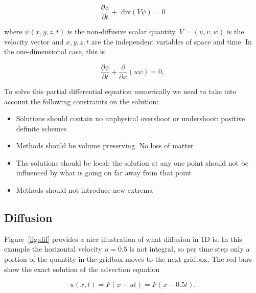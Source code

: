 \documentclass[10pt, a4paper]{article}
\begin{document}
\begin{equation}
\frac{\partial \psi}{\partial t} + \text{ div}(V\psi) = 0
\end{equation}

where $\psi(x,y,z,t)$ is the non-diffusive scalar quantity, $V=(u,v,w)$ is the velocity vector and $x,y,z,t$ are the independent variables of space and time. In the one-dimensional case, this is

\begin{equation}
\frac{\partial \psi}{\partial t} + \frac{\partial}{\partial x}(u\psi) = 0,
\end{equation}

To solve this partial differential equation numerically we need to take into account the following constraints on the solution:

\begin{itemize}
\item Solutions should contain no unphysical overshoot or undershoot: positive definite schemes
\item Methods should be volume preserving. No loss of matter
\item The solutions should be local: the solution at any one point should not be influenced by what is going on far away from that point
\item Methods should not introduce new extrema
\end{itemize}

\subsection{Diffusion}
Figure~\ref{fig:dif} provides a nice illustration of what diffusion in 1D is. In this example the horizontal velocity $u=0.5$ is not integral, so per time step only a portion of the quantity in the gridbox moves to the next gridbox. The red bars show the exact solution of the advection equation

\begin{equation}
 u(x,t)=F(x-ut)=F(x-0.5t).
\end{equation}
\end{document}
